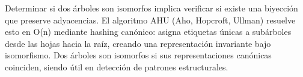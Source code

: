 \markdownRendererDocumentBegin
\markdownRendererSectionBegin
{}\markdownRendererInterblockSeparator
{}Determinar si dos árboles son isomorfos implica verificar si existe una biyección que preserve adyacencias. El algoritmo \markdownRendererDollarSign{}AHU (Aho, Hopcroft, Ullman)\markdownRendererDollarSign{} resuelve esto en \markdownRendererDollarSign{}O(n)\markdownRendererDollarSign{} mediante hashing canónico: asigna etiquetas únicas a subárboles desde las hojas hacia la raíz, creando una representación invariante bajo isomorfismo. Dos árboles son isomorfos si sus representaciones canónicas coinciden, siendo útil en detección de patrones estructurales.\markdownRendererInterblockSeparator
{}
\markdownRendererSectionEnd \markdownRendererDocumentEnd